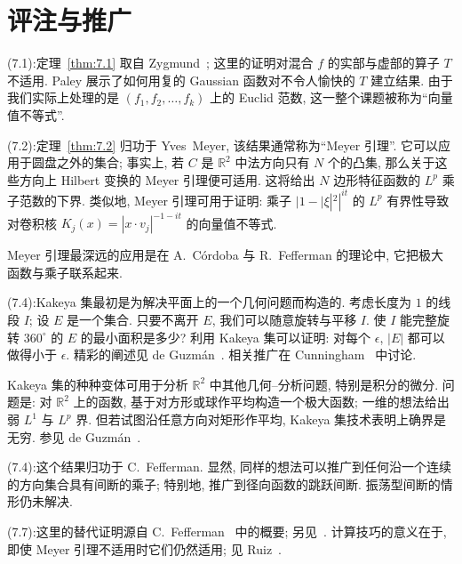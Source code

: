 \section{评注与推广}
\label{sec:7.3}

\noindent (7.1):\quad 定理~\ref{thm:7.1} 取自 Zygmund~\cite{zygmund}; 这里的证明对混合 $f$ 的实部与虚部的算子 $T$ 不适用. Paley 展示了如何用复的 Gaussian 函数对不令人愉快的 $T$ 建立结果. 由于我们实际上处理的是 $(f_1,f_2,\ldots,f_k)$ 上的 Euclid 范数, 这一整个课题被称为``向量值不等式''.

\noindent (7.2):\quad 定理~\ref{thm:7.2} 归功于 Yves~Meyer, 该结果通常称为``Meyer 引理''. 它可以应用于圆盘之外的集合; 事实上, 若 $C$ 是 $\mathbb{R}^2$ 中法方向只有 $N$ 个的凸集, 那么关于这些方向上 Hilbert 变换的 Meyer 引理便可适用. 这将给出 $N$ 边形特征函数的 $L^p$ 乘子范数的下界. 类似地, Meyer 引理可用于证明: 乘子 $|1-|\xi|^2|^{it}$ 的 $L^p$ 有界性导致对卷积核 $K_j(x)=|x\cdot v_j|^{-1-it}$ 的向量值不等式.

Meyer 引理最深远的应用是在 A.~C\'ordoba 与 R.~Fefferman 的理论中, 它把极大函数与乘子联系起来.

\noindent (7.4):\quad Kakeya 集最初是为解决平面上的一个几何问题而构造的. 考虑长度为 $1$ 的线段 $I$; 设 $E$ 是一个集合. 只要不离开 $E$, 我们可以随意旋转与平移 $I$. 使 $I$ 能完整旋转 $360^\circ$ 的 $E$ 的最小面积是多少? 利用 Kakeya 集可以证明: 对每个 $\epsilon$, $|E|$ 都可以做得小于 $\epsilon$. 精彩的阐述见 de Guzm\'an~\cite{deguzman}. 相关推广在 Cunningham~\cite{cunningham} 中讨论.

Kakeya 集的种种变体可用于分析 $\mathbb{R}^2$ 中其他几何--分析问题, 特别是积分的微分. 问题是: 对 $\mathbb{R}^2$ 上的函数, 基于对方形或球作平均构造一个极大函数; 一维的想法给出弱 $L^1$ 与 $L^p$ 界. 但若试图沿任意方向对矩形作平均, Kakeya 集技术表明上确界是无穷. 参见 de Guzm\'an~\cite{deguzman}.

\noindent (7.4):\quad 这个结果归功于 C.~Fefferman. 显然, 同样的想法可以推广到任何沿一个连续的方向集合具有间断的乘子; 特别地, 推广到径向函数的跳跃间断. 振荡型间断的情形仍未解决.

\noindent (7.7):\quad 这里的替代证明源自 C.~Fefferman~\cite{fefferman-ball} 中的概要; 另见~\cite{kenig-tomas}. 计算技巧的意义在于, 即使 Meyer 引理不适用时它们仍然适用; 见 Ruiz~\cite{cordoba-flp}.
